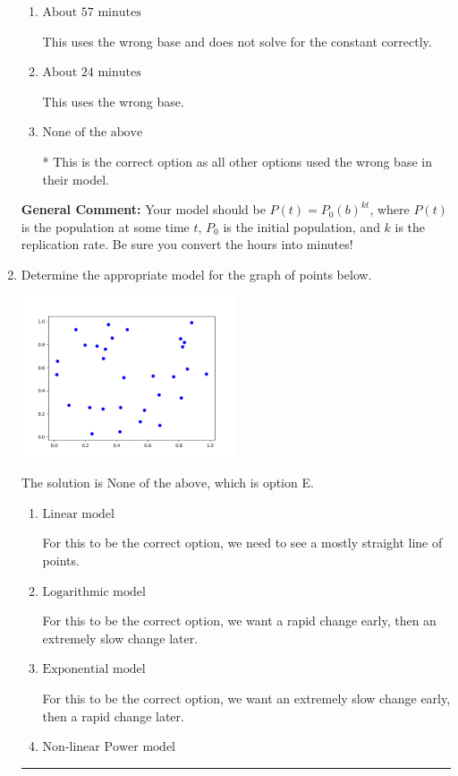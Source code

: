 \documentclass{extbook}[14pt]
\newcommand{\litem}[1]{\item #1

\rule{\textwidth}{0.4pt}}
\begin{document}
\begin{enumerate}
{\begin{enumerate}[label=\Alph*.]
This uses the wrong base and solves for the constant correctly but converted incorrectly.
\item \( \text{About } 57 \text{ minutes} \)

This uses the wrong base and does not solve for the constant correctly.
\item \( \text{About } 24 \text{ minutes} \)

This uses the wrong base.
\item \( \text{None of the above} \)

* This is the correct option as all other options used the wrong base in their model.
\end{enumerate}

\textbf{General Comment:} Your model should be $P(t) = P_0(b)^{kt}$, where $P(t)$ is the population at some time $t$, $P_0$ is the initial population, and $k$ is the replication rate. Be sure you convert the hours into minutes!
}
\litem{
Determine the appropriate model for the graph of points below.

\begin{center}
    \includegraphics[width=0.5\textwidth]{../Figures/identifyModelGraph11CopyB.png}
\end{center}


The solution is \( \text{None of the above} \), which is option E.\begin{enumerate}[label=\Alph*.]
\item \( \text{Linear model} \)

For this to be the correct option, we need to see a mostly straight line of points.
\item \( \text{Logarithmic model} \)

For this to be the correct option, we want a rapid change early, then an extremely slow change later.
\item \( \text{Exponential model} \)

For this to be the correct option, we want an extremely slow change early, then a rapid change later.
\item \( \text{Non-linear Power model} \)


\end{enumerate}}
\end{enumerate}
\end{document}
